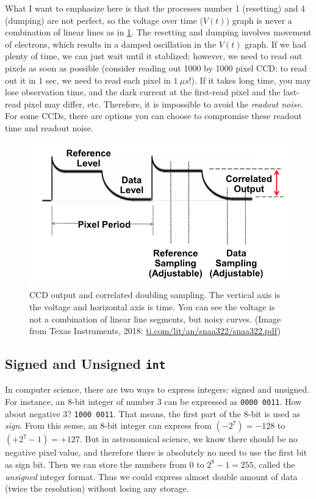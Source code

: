 What I want to emphasize here is that the processes number 1 (resetting) and 4 (dumping) are not perfect, so the voltage over time ($ V(t) $) graph is never a combination of linear lines as in \cref{fig:cds}. The resetting and dumping involves movement of electrons, which results in a damped oscillation in the $ V(t) $ graph. If we had plenty of time, we can just wait until it stablized; however, we need to read out pixels as soon as possible (consider reading out 1000 by 1000 pixel CCD: to read out it in 1 sec, we need to read each pixel in $ \SI{1}{\mu s} $!). If it takes long time, you may lose observation time, and the dark current at the first-read pixel and the last-read pixel may differ, etc. Therefore, it is impossible to avoid the \emph{readout noise}. For some CCDs, there are options you can choose to compromise these readout time and readout noise. 

\begin{figure}
\centering
\includegraphics[width=0.5\linewidth]{figs/CDS}
\caption{CCD output and correlated doubling sampling. The vertical axis is the voltage and horizontal axis is time. You can see the voltage is not a combination of linear line segments, but noisy curves. (Image from Texas Instruments, 2018: \href{ti.com/lit/an/snaa322/snaa322.pdf}{ti.com/lit/an/snaa322/snaa322.pdf})}
\label{fig:cds}
\end{figure}


\subsection{Signed and Unsigned \texttt{int}}
In computer science, there are two ways to express integers: signed and unsigned. For instance, an 8-bit integer of number 3 can be expressed as \texttt{0000 0011}. How about negative 3? \texttt{1000 0011}. That means, the first part of the 8-bit is used as \emph{sign}. From this sense, an 8-bit integer can express from $ (-2^7) = -128 $ to $ (+2^7-1) = +127 $. But in astronomical science, we know there should be no negative pixel value, and therefore there is absolutely no need to use the first bit as sign bit. Then we can store the numbers from $ 0 $ to $2^8 - 1 = 255 $, called the \emph{unsigned} integer format. Thus we could express almost double amount of data (twice the resolution) without losing any storage.

